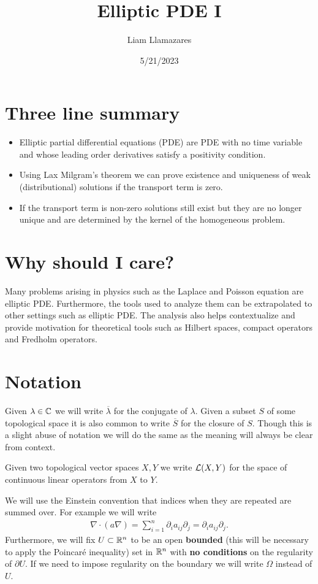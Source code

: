\documentclass[12pt]{article}
\theoremstyle{definition}
\begin{document}
\title{Elliptic PDE I}
\author{Liam Llamazares}
\date{5/21/2023}
\maketitle
\section{ Three line summary}
\begin{itemize}
	\item Elliptic partial differential equations (PDE) are PDE with no time variable and whose leading order derivatives satisfy a positivity condition.
	\item Using Lax Milgram's theorem we can prove existence and uniqueness of weak (distributional) solutions if the transport term is zero.
	\item If the transport term is non-zero solutions still exist but they are no longer unique and are determined by the kernel of the homogeneous problem.\end{itemize}
\section{Why should I care?}
Many problems arising in physics such as the Laplace and Poisson equation are elliptic PDE. Furthermore, the tools used to analyze them can be extrapolated to other settings such as
elliptic PDE. The analysis also helps contextualize and provide motivation for theoretical tools such as Hilbert spaces, compact operators and Fredholm operators.
\section{Notation}
Given $\lambda \in \mathbb{C}$ we will write $\overline{\lambda }$ for the conjugate of $\lambda $. Given a subset $S$ of some topological space it is also common to write  $\overline{S}$ for the closure of $S$. Though this is a slight abuse of notation we will do the same as the meaning will always be clear from context.

Given two topological vector spaces $X,Y$ we write  $\mathcal{L}(X,Y)$ for the space of continuous linear operators from $X$ to  $Y$.

We will use the Einstein convention that indices when they are repeated are summed over. For example we will write
\begin{align*}
	\nabla \cdot (a \nabla)=\sum_{i=1}^n \partial_i a_{ij} \partial _j =\partial_i a_{ij} \partial _j.
\end{align*}
Furthermore, we will fix $U \subset \mathbb{R}^n$ to be an open \textbf{bounded} (this will be necessary to apply the Poincaré inequality) set in $\mathbb{R}^n$ with \textbf{no conditions} on the regularity of $\partial U$. If we need to impose regularity on the boundary we will write $\Omega$ instead of $U$.
\end{document}
